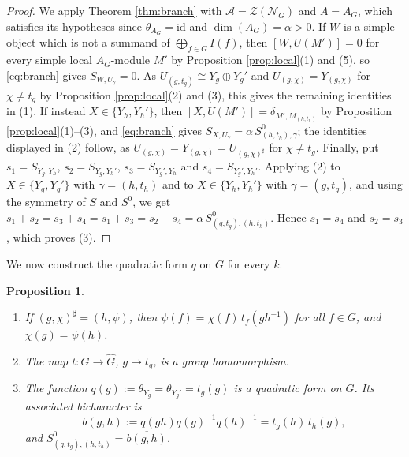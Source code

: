 \documentclass[10pt]{article}
\theoremstyle{plain}
\newtheorem{proposition}[theorem]{Proposition}
\theoremstyle{definition}
\theoremstyle{plain}
\begin{document}
\begin{proof}
We apply Theorem \ref{thm:branch} with $\mathcal{A}=\mathcal{Z}(\mathcal{N}_G)$ and $A=A_G$, which satisfies its hypotheses since $\theta_{A_G}=\mathrm{id}$ and $\dim(A_G)=\alpha>0$. If $W$ is a simple object which is not a summand of $\bigoplus_{f\in G}I(f)$, then $[W,U(M')]=0$ for every simple local $A_G$-module $M'$ by Proposition \ref{prop:local}(1) and (5), so \eqref{eq:branch} gives $S_{W,U_\gamma}=0$. As $U_{(g,t_g)}\cong Y_g\oplus Y_g'$ and $U_{(g,\chi)}=Y_{(g,\chi)}$ for $\chi\neq t_g$ by Proposition \ref{prop:local}(2) and (3), this gives the remaining identities in (1). If instead $X\in\{Y_h,Y_h'\}$, then $[X,U(M')]=\delta_{M',M_{(h,t_h)}}$ by Proposition \ref{prop:local}(1)--(3), and \eqref{eq:branch} gives $S_{X,U_\gamma}=\alpha\,S^0_{(h,t_h),\gamma}$; the identities displayed in (2) follow, as $U_{(g,\chi)}=Y_{(g,\chi)}=U_{(g,\chi)^\sharp}$ for $\chi\neq t_g$. Finally, put $s_1=S_{Y_g,Y_h}$, $s_2=S_{Y_g,Y_h'}$, $s_3=S_{Y_g',Y_h}$ and $s_4=S_{Y_g',Y_h'}$. Applying (2) to $X\in\{Y_g,Y_g'\}$ with $\gamma=(h,t_h)$ and to $X\in\{Y_h,Y_h'\}$ with $\gamma=(g,t_g)$, and using the symmetry of $S$ and $S^0$, we get $s_1+s_2=s_3+s_4=s_1+s_3=s_2+s_4=\alpha\,S^0_{(g,t_g),(h,t_h)}$. Hence $s_1=s_4$ and $s_2=s_3$, which proves (3).
\end{proof}

We now construct the quadratic form $q$ on $G$ for every $k$.

\begin{proposition}\label{prop:tq}
\leavevmode
\begin{enumerate}
\item If $(g,\chi)^\sharp=(h,\psi)$, then $\psi(f)=\chi(f)\,t_f(gh^{-1})$ for all $f\in G$, and $\chi(g)=\psi(h)$.
\item The map $t\colon G\to\widehat{G}$, $g\mapsto t_g$, is a group homomorphism.
\item The function $q(g):=\theta_{Y_g}=\theta_{Y_g'}=t_g(g)$ is a quadratic form on $G$. Its associated bicharacter is
\begin{equation}\label{eq:bt}
b(g,h):=q(gh)q(g)^{-1}q(h)^{-1}=t_g(h)\,t_h(g),
\end{equation}
and $S^0_{(g,t_g),(h,t_h)}=\overline{b(g,h)}$.
\end{enumerate}
\end{proposition}
\end{document}

